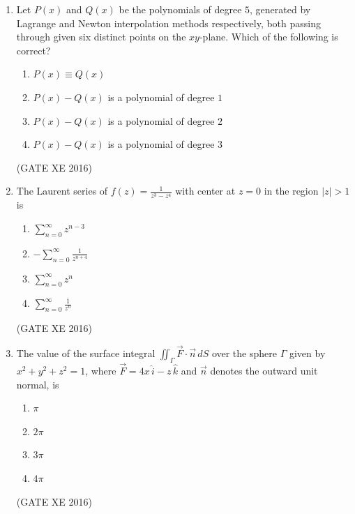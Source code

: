 \documentclass[12pt]{article}
\begin{document}
\begin{enumerate}
\begin{enumerate}
    \item $\dfrac{\partial^{2}u}{\partial t^{2}} + u^{2} = 0$  
    \item $\left( \dfrac{\partial u}{\partial t} \right)^{2} + \dfrac{\partial u}{\partial x} = 0$  
    \item $\left( \dfrac{\partial u}{\partial t} \right)^{2} - \left( \dfrac{\partial u}{\partial x} \right)^{2} = 0$  
    \item $\left( \dfrac{\partial u}{\partial t} \right)^{4} - \left( \dfrac{\partial u}{\partial x} \right)^{3} = 0$  
\end{enumerate}

(GATE XE 2016)  

\item Let $P(x)$ and $Q(x)$ be the polynomials of degree $5$, generated by Lagrange and Newton interpolation methods respectively, both passing through given six distinct points on the $xy$-plane. Which of the following is correct?  

\begin{enumerate}
    \item $P(x) \equiv Q(x)$  
    \item $P(x) - Q(x)$ is a polynomial of degree $1$  
    \item $P(x) - Q(x)$ is a polynomial of degree $2$  
    \item $P(x) - Q(x)$ is a polynomial of degree $3$  
\end{enumerate}

(GATE XE 2016)  

\item The Laurent series of $f(z) = \frac{1}{z^3 - z^4}$ with center at $z=0$ in the region $|z| > 1$ is
\begin{multicols}{4}
\begin{enumerate}
\item $\sum_{n=0}^{\infty} z^{n-3}$
\item $-\sum_{n=0}^{\infty} \frac{1}{z^{n+4}}$
\item $\sum_{n=0}^{\infty} z^n$
\item $\sum_{n=0}^{\infty} \frac{1}{z^n}$
\end{enumerate}
\end{multicols}
(GATE XE 2016)

\item The value of the surface integral $\iint_{\Gamma} \vec{F} \cdot \vec{n} \, dS$ over the sphere $\Gamma$ given by $x^2+y^2+z^2=1$, where $\vec{F}=4x \, \hat{i} - z \, \hat{k}$ and $\vec{n}$ denotes the outward unit normal, is
\begin{multicols}{4}
\begin{enumerate}
\item $\pi$
\item $2\pi$
\item $3\pi$
\item $4\pi$
\end{enumerate}
\end{multicols}
(GATE XE 2016)



\end{enumerate}
\end{document}
